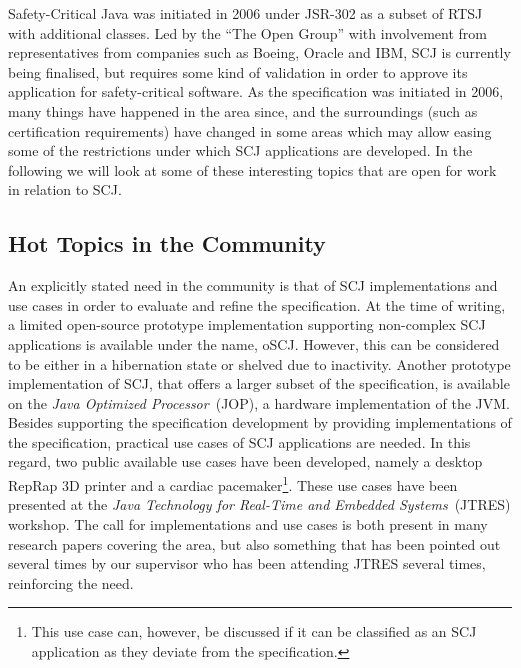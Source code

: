 Safety-Critical Java was initiated in 2006 under JSR-302 as a subset of RTSJ with additional classes\cite{Schoeberl:2012:SCJonJava}. Led by the ``The Open Group'' with involvement from representatives from companies such as Boeing, Oracle and IBM, SCJ is currently being finalised, but requires some kind of validation in order to approve its application for safety-critical software. As the specification was initiated in 2006, many things have happened in the area since, and the surroundings (such as certification requirements) have changed in some areas which may allow easing some of the restrictions under which SCJ applications are developed. In the following we will look at some of these interesting topics that are open for work in relation to SCJ.



\subsection{Hot Topics in the Community} %
\label{sub:interestingresearch}
An explicitly stated need in the community is that of SCJ implementations and use cases\cite{Schoeberl:2012:SCJonJava} in order to evaluate and refine the specification.
At the time of writing, a limited open-source prototype implementation supporting non-complex SCJ applications is available under the name, oSCJ\cite{oSCJ}. However, this can be considered to be either in a hibernation state or shelved due to inactivity. Another prototype implementation of SCJ, that offers a larger subset of the specification, is available on the \textit{Java Optimized Processor}~(JOP), a hardware implementation of the JVM\cite{Schoeberl:2012:SCJonJava}. Besides supporting the specification development by providing implementations of the specification, practical use cases of SCJ applications are needed. In this regard, two public available use cases have been developed, namely a desktop RepRap 3D printer\cite{Schoeberl:2012:RepRap} and a cardiac pacemaker\cite{Singh:2012:CPC:2388936.2388948}\footnote{This use case can, however, be discussed if it can be classified as an SCJ application as they deviate from the specification.}. These use cases have been presented at the \textit{Java Technology for Real-Time and Embedded Systems}~(JTRES) workshop. The call for implementations and use cases is both present in many research papers covering the area, but also something that has been pointed out several times by our supervisor who has been attending JTRES several times, reinforcing the need.

